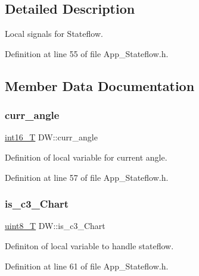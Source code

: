 \subsection{Detailed Description}
Local signals for Stateflow. 

Definition at line 55 of file App\+\_\+\+Stateflow.\+h.



\subsection{Member Data Documentation}
\mbox{\label{struct_d_w_ab0801640ad5fc131a2c3e085d9986836}} 
\subsubsection{\texorpdfstring{curr\+\_\+angle}{curr\_angle}}
{\footnotesize\ttfamily \mbox{\hyperlink{_app___stateflowtypes_8h_ad73c6af88bb2ce70799e51f639309f21}{int16\+\_\+T}} D\+W\+::curr\+\_\+angle}



Definition of local variable for current angle. 



Definition at line 57 of file App\+\_\+\+Stateflow.\+h.

\mbox{\label{struct_d_w_a3b1191ce727da1e17f5a8923eb06ae80}} 
\subsubsection{\texorpdfstring{is\+\_\+c3\+\_\+\+Chart}{is\_c3\_Chart}}
{\footnotesize\ttfamily \mbox{\hyperlink{_app___stateflowtypes_8h_a2532a6244e023eee49f315c10f1f7c53}{uint8\+\_\+T}} D\+W\+::is\+\_\+c3\+\_\+\+Chart}



Definiton of local variable to handle stateflow. 



Definition at line 61 of file App\+\_\+\+Stateflow.\+h.

\mbox{\label{struct_d_w_a2736d80f513d2e420f13698e8baa6c59}} 
